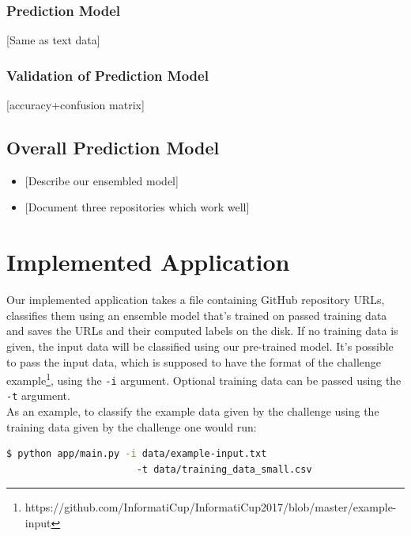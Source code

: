 \documentclass[a4paper,12pt]{article}
\begin{document}
\subsubsection{Prediction Model}\label{prediction-model-2}

{[}Same as text data{]}

\subsubsection{Validation of Prediction
Model}\label{validation-of-prediction-model-2}

{[}accuracy+confusion matrix{]}

\subsection{Overall Prediction
Model}\label{overall-prediction-model}

\begin{itemize}
\tightlist
\item
  {[}Describe our ensembled model{]}
\item
  {[}Document three repositories which work well{]}
\end{itemize}

\section{Implemented Application}\label{implemented-application}

Our implemented application takes a file containing GitHub repository
URLs, classifies them using an ensemble model that's trained on passed
training data and saves the URLs and their computed labels on the disk.
If no training data is given, the input data will be classified using
our pre-trained model. It's possible to pass the input data, which is
supposed to have the format of the
challenge example\footnote{https://github.com/InformatiCup/InformatiCup2017/blob/master/example-input}, using the \texttt{-i} argument. Optional training data can be
passed using the \texttt{-t} argument.\\
As an example, to classify the example data given by the challenge using
the training data given by the challenge one would run:

\begin{lstlisting}[language=bash]
  $ python app/main.py -i data/example-input.txt
                       -t data/training_data_small.csv
\end{lstlisting}
\end{document}
